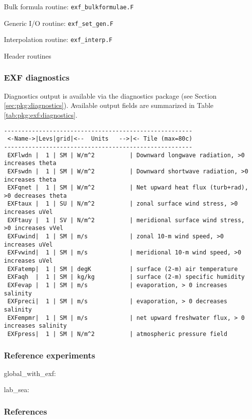 Bulk formula routine: \texttt{exf\_bulkformulae.F}

Generic I/O routine: \texttt{exf\_set\_gen.F}

Interpolation routine: \texttt{exf\_interp.F}

Header routines


\subsubsection{EXF diagnostics
\label{sec:pkg:exf:diagnostics}}

Diagnostics output is available via the diagnostics package
(see Section \ref{sec:pkg:diagnostics}).
Available output fields are summarized in 
Table \ref{tab:pkg:exf:diagnostics}.

\begin{table}[h!]
\label{tab:pkg:exf:diagnostics}
{\footnotesize
\begin{verbatim}
------------------------------------------------------
 <-Name->|Levs|grid|<--  Units   -->|<- Tile (max=80c)
------------------------------------------------------
 EXFlwdn |  1 | SM | W/m^2          | Downward longwave radiation, >0 increases theta
 EXFswdn |  1 | SM | W/m^2          | Downward shortwave radiation, >0 increases theta
 EXFqnet |  1 | SM | W/m^2          | Net upward heat flux (turb+rad), >0 decreases theta
 EXFtaux |  1 | SU | N/m^2          | zonal surface wind stress, >0 increases uVel
 EXFtauy |  1 | SV | N/m^2          | meridional surface wind stress, >0 increases vVel
 EXFuwind|  1 | SM | m/s            | zonal 10-m wind speed, >0 increases uVel
 EXFvwind|  1 | SM | m/s            | meridional 10-m wind speed, >0 increases uVel
 EXFatemp|  1 | SM | degK           | surface (2-m) air temperature
 EXFaqh  |  1 | SM | kg/kg          | surface (2-m) specific humidity
 EXFevap |  1 | SM | m/s            | evaporation, > 0 increases salinity
 EXFpreci|  1 | SM | m/s            | evaporation, > 0 decreases salinity
 EXFempmr|  1 | SM | m/s            | net upward freshwater flux, > 0 increases salinity
 EXFpress|  1 | SM | N/m^2          | atmospheric pressure field
\end{verbatim}
}
\caption{~}
\end{table}


\subsubsection{Reference experiments}

global\_with\_exf:

lab\_sea:


\subsubsection{References}
